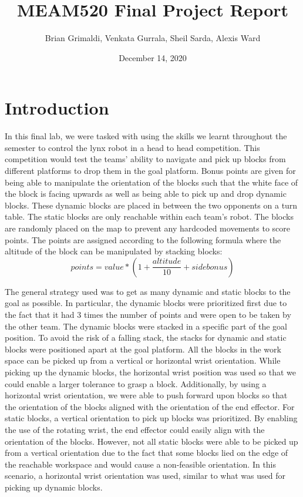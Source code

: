 \documentclass{article}
\begin{document}
\title{MEAM520 Final Project Report}
\author{Brian Grimaldi, Venkata Gurrala, Sheil Sarda, Alexis Ward}
\date{December 14, 2020}


\maketitle


\section{Introduction}
In this final lab, we were tasked with using the skills we learnt throughout the semester to control the lynx robot in a head to head competition. This competition would test the teams' ability to navigate and pick up blocks from different platforms to drop them in the goal platform. Bonus points are given for being able to manipulate the orientation of the blocks such that the white face of the block is facing upwards as well as being able to pick up and drop dynamic blocks. These dynamic blocks are placed in between the two opponents on a turn table. The static blocks are only reachable within each team's robot. The blocks are randomly placed on the map to prevent any hardcoded movements to score points. The points are assigned according to the following formula where the altitude of the block can be manipulated by stacking blocks:
\[
points=value*(1+\frac{altitude}{10}+sidebonus)
\]

The general strategy used was to get as many dynamic and static blocks to the goal as possible. In particular, the dynamic blocks were prioritized first due to the fact that it had 3 times the number of points and were open to be taken by the other team. The dynamic blocks were stacked in a specific part of the goal position. To avoid the risk of a falling stack, the stacks for dynamic and static blocks were positioned apart at the goal platform. All the blocks in the work space can be picked up from a vertical or horizontal wrist orientation. While picking up the dynamic blocks, the horizontal wrist position was used so that we could enable a larger tolerance to grasp a block. Additionally, by using a horizontal wrist orientation, we were able to push forward upon blocks so that the orientation of the blocks aligned with the orientation of the end effector. For static blocks, a vertical orientation to pick up blocks was prioritized. By enabling the use of the rotating wrist, the end effector could easily align with the orientation of the blocks. However, not all static blocks were able to be picked up from a vertical orientation due to the fact that some blocks lied on the edge of the reachable workspace and would cause a non-feasible orientation. In this scenario, a horizontal wrist orientation was used, similar to what was used for picking up dynamic blocks.
\end{document}
